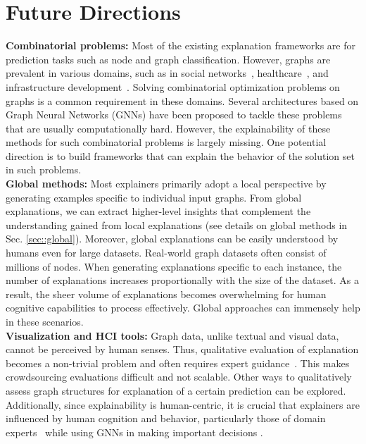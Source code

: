 \section{Future Directions}
\label{sec:future_work}

\textbf{Combinatorial problems: } Most of the existing explanation frameworks are for prediction tasks such as node and graph classification. However, graphs are prevalent in various domains, such as in social networks~\cite{kempe2003maximizing,medya2020approximate}, healthcare~\cite{wilder2018optimizing}, and infrastructure development~\cite{medya2018noticeable,medya2016towards}. Solving combinatorial optimization problems on graphs is a common requirement in these domains. Several architectures based on Graph Neural Networks (GNNs) \cite{khalil2017learning,manchanda2020gcomb,ranjan2022greed} have been proposed to tackle these problems that are usually computationally hard. However, the explainability of these methods for such combinatorial problems is largely missing. One potential direction is to build frameworks that can explain the behavior of the solution set in such problems. \\
\noindent 
\textbf{Global methods: } 
Most explainers primarily adopt a local perspective by generating examples specific to individual input graphs. From global explanations, we can extract higher-level insights that complement the understanding gained from local explanations (see details on global methods in Sec. \ref{sec::global}). Moreover, global explanations can be easily understood by humans even for large datasets.
Real-world graph datasets often consist of millions of nodes. When generating explanations specific to each instance, the number of explanations increases proportionally with the size of the dataset. As a result, the sheer volume of explanations becomes overwhelming for human cognitive capabilities to process effectively. Global approaches can immensely help in these scenarios. \\
\noindent
\textbf{Visualization and HCI tools: } Graph data, unlike textual and visual data, cannot be perceived by human senses. Thus, qualitative evaluation of explanation becomes a non-trivial problem and often requires expert guidance~\cite{ying2019gnnexplainer,pgm-ex}. This makes crowdsourcing evaluations difficult and not scalable. Other ways to qualitatively assess graph structures for explanation of a certain prediction can be explored. Additionally, since explainability is human-centric, it is crucial that explainers are influenced by human cognition and behavior, particularly those of domain experts~\cite{liao2021human} while using GNNs in making important decisions \cite{medya2022exploratory}.

